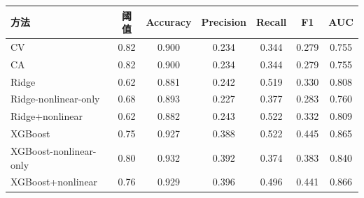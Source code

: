 \begin{tabular}{lcccccc}
\toprule
方法 & 阈值 & Accuracy & Precision & Recall & F1 & AUC \\ 
\midrule
CV & 0.82 & 0.900 & 0.234 & 0.344 & 0.279 & 0.755 \\ 
CA & 0.82 & 0.900 & 0.234 & 0.344 & 0.279 & 0.755 \\ 
Ridge & 0.62 & 0.881 & 0.242 & 0.519 & 0.330 & 0.808 \\ 
Ridge-nonlinear-only & 0.68 & 0.893 & 0.227 & 0.377 & 0.283 & 0.760 \\ 
Ridge+nonlinear & 0.62 & 0.882 & 0.243 & 0.522 & 0.332 & 0.809 \\ 
XGBoost & 0.75 & 0.927 & 0.388 & 0.522 & 0.445 & 0.865 \\ 
XGBoost-nonlinear-only & 0.80 & 0.932 & 0.392 & 0.374 & 0.383 & 0.840 \\ 
XGBoost+nonlinear & 0.76 & 0.929 & 0.396 & 0.496 & 0.441 & 0.866 \\ 
\bottomrule
\end{tabular}
